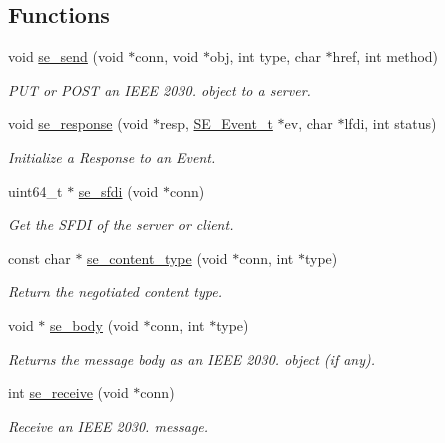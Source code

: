 \subsection*{Functions}
\begin{DoxyCompactItemize}
\item 
void \hyperlink{group__se__connection_ga0a92824fc6a6d3ed2bdf433ba00aebc0}{se\+\_\+send} (void $\ast$conn, void $\ast$obj, int type, char $\ast$href, int method)
\begin{DoxyCompactList}\small\item\em P\+UT or P\+O\+ST an I\+E\+EE 2030. object to a server. \end{DoxyCompactList}\item 
void \hyperlink{group__se__connection_ga13afc522df9bb8bcc2ce6908c95f3ec9}{se\+\_\+response} (void $\ast$resp, \hyperlink{structSE__Event__t}{S\+E\+\_\+\+Event\+\_\+t} $\ast$ev, char $\ast$lfdi, int status)
\begin{DoxyCompactList}\small\item\em Initialize a Response to an Event. \end{DoxyCompactList}\item 
uint64\+\_\+t $\ast$ \hyperlink{group__se__connection_ga4bb69847ff4ebb89bf7e84aa80960c53}{se\+\_\+sfdi} (void $\ast$conn)
\begin{DoxyCompactList}\small\item\em Get the S\+F\+DI of the server or client. \end{DoxyCompactList}\item 
const char $\ast$ \hyperlink{group__se__connection_gadd4baee7388cfb3c1f39a33bbbf9f4b1}{se\+\_\+content\+\_\+type} (void $\ast$conn, int $\ast$type)
\begin{DoxyCompactList}\small\item\em Return the negotiated content type. \end{DoxyCompactList}\item 
void $\ast$ \hyperlink{group__se__connection_gaa358895b986fa80d6ab485646b63f04e}{se\+\_\+body} (void $\ast$conn, int $\ast$type)
\begin{DoxyCompactList}\small\item\em Returns the message body as an I\+E\+EE 2030. object (if any). \end{DoxyCompactList}\item 
int \hyperlink{group__se__connection_ga4d041c447020f6ba4d310facc21f1776}{se\+\_\+receive} (void $\ast$conn)
\begin{DoxyCompactList}\small\item\em Receive an I\+E\+EE 2030. message. \end{DoxyCompactList}\item 

\end{DoxyCompactItemize}
